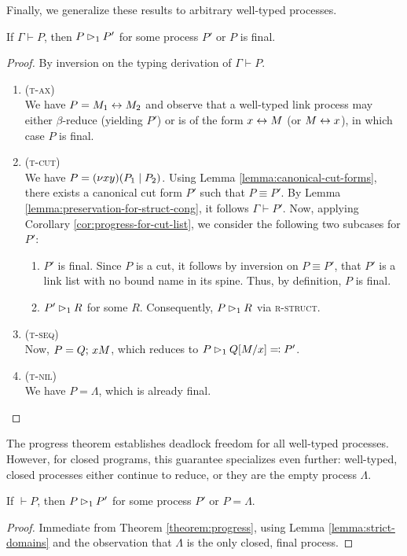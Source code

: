 Finally, we generalize these results to arbitrary well-typed processes.

\begin{theorem} \label{theorem:progress}
  If $\Gamma \vdash P$, then $P \rhd_1 P'$ for some process $P'$ or
  $P$ is final.
\end{theorem}
\begin{proof}
  By inversion on the typing derivation of $\Gamma \vdash P$.
  \begin{enumerate}[itemsep=1em, label=Case:, leftmargin=*]
    \item (\textsc{t-ax}) \\
      We have $P = M_1 \leftrightarrow M_2$ and observe that a well-typed link process
      may either $\beta$-reduce (yielding $P'$) or is of the form $x \leftrightarrow M$ (or $M \leftrightarrow x$),
      in which case $P$ is final.

    \item (\textsc{t-cut}) \\
      We have $P = (\nu x y)(P_1 \mid P_2)$. Using Lemma
      \ref{lemma:canonical-cut-forms}, there exists a canonical cut form
      $P'$ such that $P \equiv P'$. By Lemma \ref{lemma:preservation-for-struct-cong},
      it follows $\Gamma \vdash P'$.
      Now, applying Corollary \ref{cor:progress-for-cut-list}, we consider
      the following two subcases for $P'$:
      \begin{enumerate}[label=(\roman*)]
        \item $P'$ is final. Since $P$ is a cut, it follows by inversion
              on $P \equiv P'$, that $P'$ is a link list with no bound
              name in its spine. Thus, by definition, $P$ is final.
        \item $P' \rhd_1 R$ for some $R$. Consequently, $P \rhd_1 R$ via \textsc{r-struct}.
      \end{enumerate}

    \item (\textsc{t-seq}) \\
      Now, $P = Q ;\, xM$, which reduces to $P \rhd_1 Q[M/x] \eqcolon P'$.

    \item (\textsc{t-nil}) \\
      We have $P = \Lambda$, which is already final.
  \end{enumerate}
\end{proof}

The progress theorem establishes deadlock freedom for all well-typed processes.
However, for closed programs, this guarantee specializes even further:
well-typed, closed processes either continue to reduce, or they are the empty process $\Lambda$.

\begin{corollary} \label{cor:progress-closed-proc}
  If $\vdash P$, then $P \rhd_1 P'$ for some process $P'$ or
  $P = \Lambda$.
\end{corollary}
\begin{proof}
  Immediate from Theorem \ref{theorem:progress}, using Lemma \ref{lemma:strict-domains} and the observation that
  $\Lambda$ is the only closed, final process.
\end{proof}

